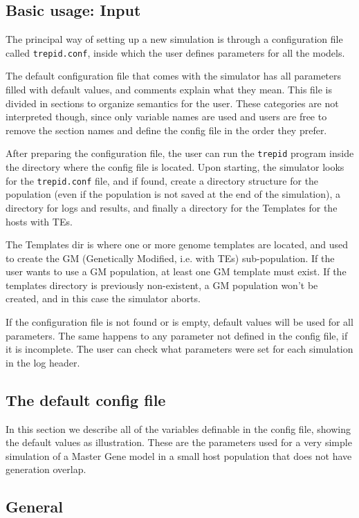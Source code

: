 \documentclass[10pt]{article}
\begin{document}
\subsection{Basic usage: Input}
The principal way of setting up a new simulation is through a
configuration file called \verb|trepid.conf|, inside which the user
defines parameters for all the models.

The default configuration file that comes with the simulator has all
parameters filled with default values, and comments explain what they
mean. This file is divided in sections to organize semantics for the
user. These categories are not interpreted though, since only variable
names are used and users are free to remove the section names and
define the config file in the order they prefer.

After preparing the configuration file, the user can run the
\verb|trepid| program inside the directory where the config file is
located. Upon starting, the simulator looks for the \verb|trepid.conf|
file, and if found, create a directory structure for the population
(even if the population is not saved at the end of the simulation), a
directory for logs and results, and finally a directory for the
Templates for the hosts with TEs.

The Templates dir is where one or more genome templates are located,
and used to create the GM (Genetically Modified, i.e. with TEs)
sub-population. If the user wants to use a GM population, at least one
GM template must exist. If the templates directory is previously
non-existent, a GM population won't be created, and in this case the
simulator aborts.

If the configuration file is not found or is empty, default values
will be used for all parameters. The same happens to any parameter not
defined in the config file, if it is incomplete. The user can check
what parameters were set for each simulation in the log header.

\subsection{The default config file}
\label{sec:default_config}

In this section we describe all of the variables definable in the
config file, showing the default values as illustration. These are the
parameters used for a very simple simulation of a Master Gene model in
a small host population that does not have generation overlap.

\subsection{General}
\label{sec:default_config_general}
\end{document}

